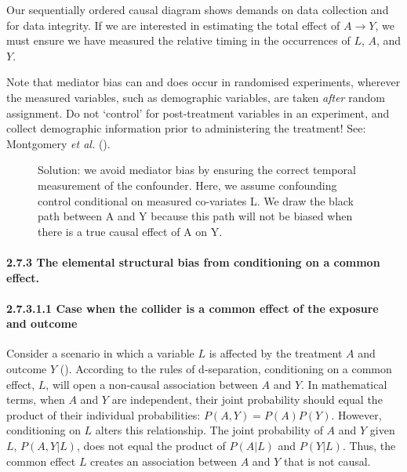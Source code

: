 \documentclass[
  singlecolumn]{article}
\let\oldparagraph\paragraph
\renewcommand{\paragraph}[1]{\oldparagraph{#1}\mbox{}}
\begin{document}
Our sequentially ordered causal diagram shows demands on data collection
and for data integrity. If we are interested in estimating the total
effect of \(A\to Y\), we must ensure we have measured the relative
timing in the occurrences of \(L\), \(A\), and \(Y\).

Note that mediator bias can and does occur in randomised experiments,
wherever the measured variables, such as demographic variables, are
taken \emph{after} random assignment. Do not `control' for
post-treatment variables in an experiment, and collect demographic
information prior to administering the treatment! See: Montgomery
\emph{et al.} ().

\begin{figure}


\caption{\label{fig-dag-common-effect-solution-2}Solution: we avoid
mediator bias by ensuring the correct temporal measurement of the
confounder. Here, we assume confounding control conditional on measured
co-variates L. We draw the black path between A and Y because this path
will not be biased when there is a true causal effect of A on Y.}

\end{figure}%

\paragraph{2.7.3 The elemental structural bias from conditioning on a
common
effect.}\label{the-elemental-structural-bias-from-conditioning-on-a-common-effect.}

\paragraph{2.7.3.1.1 Case when the collider is a common effect of the
exposure and
outcome}\label{case-when-the-collider-is-a-common-effect-of-the-exposure-and-outcome}

Consider a scenario in which a variable \(L\) is affected by the
treatment \(A\) and outcome \(Y\) (). According to the rules of d-separation, conditioning on a
common effect, \(L\), will open a non-causal association between \(A\)
and \(Y\). In mathematical terms, when \(A\) and \(Y\) are independent,
their joint probability should equal the product of their individual
probabilities: \(P(A, Y) = P(A)P(Y)\). However, conditioning on \(L\)
alters this relationship. The joint probability of \(A\) and \(Y\) given
\(L\), \(P(A, Y | L)\), does not equal the product of \(P(A | L)\) and
\(P(Y | L)\). Thus, the common effect \(L\) creates an association
between \(A\) and \(Y\) that is not causal.
\end{document}
